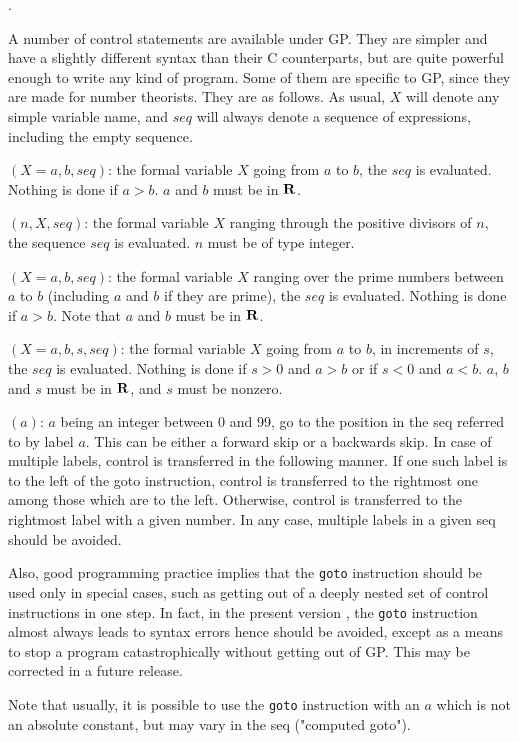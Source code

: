 .

A number of control statements are available under GP. They are simpler and have a
slightly different syntax than their C counterparts, but are quite powerful enough
to write any kind of program. Some of them are specific to GP, since they are made
for number theorists. They are as follows. As usual, $X$ will denote any simple variable
name, and $seq$ will always denote a sequence of expressions, including the empty
sequence.

$(X=a,b,seq)$: the formal variable $X$ going from $a$ to $b$,
the $seq$ is evaluated. Nothing is done if $a>b$. $a$ and $b$ must be in $\Bbb R$.

$(n,X,seq)$: the formal variable $X$ ranging through the
positive divisors of $n$, the sequence $seq$ is evaluated. $n$ must be of type integer.

$(X=a,b,seq)$: the formal variable $X$ ranging over the prime
numbers between $a$ to $b$ (including $a$ and $b$ if they are prime),
the $seq$ is evaluated. Nothing is done if $a>b$. Note that $a$ and $b$
must be in $\Bbb R$.

$(X=a,b,s,seq)$: the formal variable $X$ going from $a$ to
$b$, in increments of $s$, the $seq$ is evaluated. Nothing is done if $s>0$ and 
$a>b$ or if $s<0$ and $a<b$. $a$, $b$ and $s$ must be in $\Bbb R$, and $s$ must
be nonzero.

$(a)$: $a$ being an integer between 0 and 99, go to the
position in the seq referred to by label $a$. This can be either a forward skip
or a backwards skip. In case of multiple labels, control is transferred in the
following manner. If one such label is to the left of the goto instruction, 
control is transferred to the rightmost one among those which are to the left.
Otherwise, control is transferred to the rightmost label with a given number.
In any case, multiple labels in a given seq should be avoided. 

Also, good programming practice implies that the 
{\tt goto} instruction should be used only in special cases, such as getting
out of a deeply nested set of control instructions in one step.
In fact, in the present version \vers, the {\tt goto} instruction almost always
leads to syntax errors hence should be avoided, except as a means to stop a
program catastrophically without getting out of GP. This may be corrected in a
future release.

Note that usually, it is possible to use the {\tt goto} instruction
with an $a$ which is not an absolute constant, but may vary in the seq
("computed goto").

